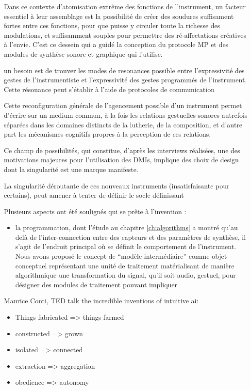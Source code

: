 Dans ce contexte d'atomisation extrême des fonctions de l'instrument, un facteur essentiel à leur assemblage est la possibilité de créer des soudures suffisament fortes entre ces fonctions, pour que puisse y circuler toute la richesse des modulations, et suffisamment souples pour permettre des ré-affectations créatives à l'envie. C'est ce dessein qui a guidé la conception du protocole MP et des modules de synthèse sonore et graphique qui l'utilise.

un besoin est de trouver les modes de resonances possible entre l'expressivité des gestes de l'instrumentiste et l'expressivité des gestes programmés de l'instrument. Cette résonance peut s'établir à l'aide de protocoles de communication 

Cette reconfiguration générale de l'agencement possible d'un instrument permet d'écrire sur un medium commun, à la fois les relations gestuelles-sonores autrefois séparées dans les domaines distincts de la lutherie, de la composition, et d'autre part les mécanismes cognitifs propres à la perception de ces relations.


Ce champ de possibilités, qui constitue, d'après les interviews réalisées, une des motivations majeures pour l'utilisation des \glspl{DMI}, implique des choix de design dont la singularité est une marque manifeste. 

La singularité déroutante de ces nouveaux instruments (insatisfaisante pour certains), peut amener à tenter de définir le socle définissant



Plusieurs aspects ont été soulignés qui se prête à l'invention : 
\vspace{-1em}
\begin{itemize}[noitemsep]
	\item la programmation, dont l'étude au chapitre \ref{ch:algorithms} a montré qu'au delà de l'inter-connection entre des capteurs et des paramètres de synthèse, il s'agit de l'endroit principal où se définit le comportement de l'instrument. Nous avons proposé le concept de ``modèle intermédiaire'' comme objet conceptuel représentant une unité de traitement matérialisant de manière algorithmique une transformation du signal, qu'il soit audio, gestuel, pour désigner des modules de traitement pouvant impliquer 
\end{itemize}

Maurice Conti, TED talk the incredible inventions of intuitive ai:
\vspace{-1em}
\begin{itemize}[noitemsep]
	\item Things fabricated => things farmed
	\item constructed => grown
	\item isolated => connected
	\item extraction => aggregation
	\item obedience => autonomy
\end{itemize}


